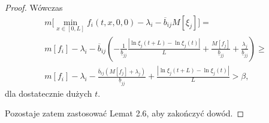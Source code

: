\begin{proof}
		Wówczas
		\begin{equation}
			\begin{split}
				m\bigl[\min_{x\in [0,L]} f_i(t,x,0,0) 
				- \lambda_i - \overline{b}_{ij} M[\xi_j]\bigr] 
				= \\
				m[f_i] - \lambda_i 
				- \overline{b}_{ij} \left(
				-\frac{1}{\underline{b}_{jj}}
				\frac{|\ln \xi_j(t+L) - \ln \xi_j(t)|}{L}
				+ \frac{M[f_j]}{\underline{b}_{jj}} 
				+ \frac{\lambda_j}{\underline{b}_{jj}}
				\right)
				\ge \\
				m[f_i] - \lambda_i 
				- \frac{\overline{b}_{ij}(M[f_j] + \lambda_j)}{\underline{b}_{jj}}
				+ \frac{|\ln \xi_j(t+L) - \ln \xi_j(t)|}{L}
				> \beta,
			\end{split}
		\end{equation}
		dla dostatecznie dużych $t$.
		
		Pozostaje zatem zastosować Lemat 2.6, aby zakończyć dowód.
	\end{proof}
	

